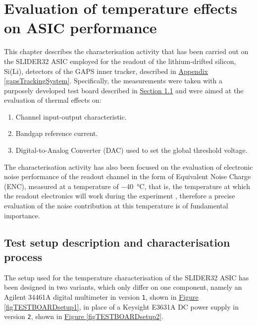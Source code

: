 \chapter{Evaluation of temperature effects on ASIC performance} \label{ch1}

This chapter describes the characterisation activity that has been carried out on the SLIDER32 ASIC employed for the readout of the lithium-drifted silicon, Si(Li), detectors of the GAPS inner tracker, described in \hyperref[gapsTrackingSystem]{Appendix \ref{gapsTrackingSystem}}. Specifically, the measurements were taken with a purposely developed test board described in \hyperref[testboardsetup]{Section \ref{testboardsetup}} and were aimed at the evaluation of thermal effects on:

\begin{enumerate}
    \itemsep0em 
    \item Channel input-output characteristic.
    \item Bandgap reference current.
    \item Digital-to-Analog Converter (DAC) used to set the global threshold voltage.
\end{enumerate}

\par
The characterisation activity has also been focused on the evaluation of electronic noise performance of the readout channel in the form of Equivalent Noise Charge (ENC), measured at a temperature of \SI{-40}{\celsius}, that is, the temperature at which the readout electronics will work during the experiment \cite{re_2022_a}, therefore a precise evaluation of the noise contribution at this temperature is of fundamental importance.


\section[Test setup description and characterisation process]{Test setup description and characterisation\\ process} \label{testboardsetup}

The setup used for the temperature characterisation of the SLIDER32 ASIC has been designed in two variants, which only differ on one component, namely an Agilent 34461A digital multimeter in version \texttt{1}, shown in \hyperref[figTESTBOARDsetup1]{Figure \ref{figTESTBOARDsetup1}}, in place of a Keysight E3631A DC power supply in version \texttt{2}, shown in \hyperref[figTESTBOARDsetup2]{Figure \ref{figTESTBOARDsetup2}}.

